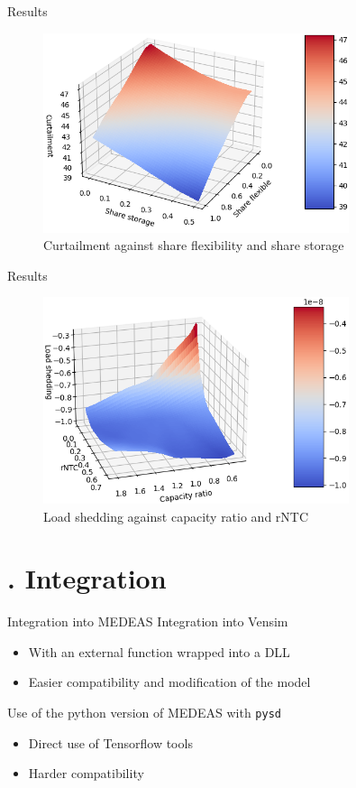 \documentclass{beamer}
\newcommand{\mysection}[1]{\section{\thesection. #1}}
\begin{document}
    \begin{frame}{Results}
        \begin{figure}[h]
            \centering
            \includegraphics[width=0.8\textwidth]{../resources/images/view_1-2-0.png}
            \caption{Curtailment against share flexibility and share storage}
        \end{figure}
    \end{frame}

    \begin{frame}{Results}
        \begin{figure}[h]
            \centering
            \includegraphics[width=0.8\textwidth]{../resources/images/view_0-5-1.png}
            \caption{Load shedding against capacity ratio and rNTC}
        \end{figure}
    \end{frame}

    \mysection{Integration}

    \begin{frame}{Integration into MEDEAS}
        Integration into Vensim
        \begin{itemize}
            \item With an external function wrapped into a DLL
            \item Easier compatibility and modification of the model
        \end{itemize}
        Use of the python version of MEDEAS with \texttt{pysd}
        \begin{itemize}
            \item Direct use of Tensorflow tools
            \item Harder compatibility
        \end{itemize}
    \end{frame}
\end{document}
